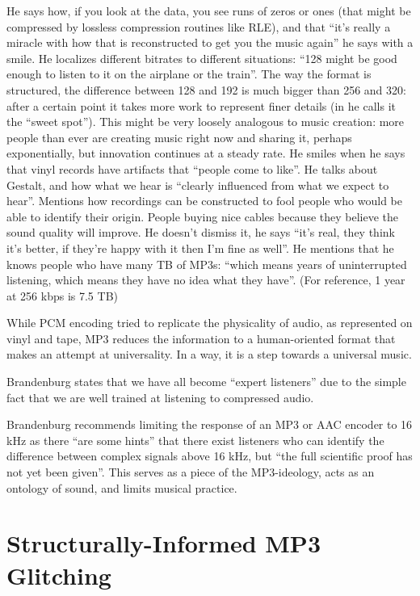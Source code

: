 \documentclass{thesis}
\begin{document}
He says how, if you look at the data, you see runs of zeros or ones (that might be compressed by lossless compression routines like RLE), and that ``it's really a miracle with how that is reconstructed to get you the music again'' he says with a smile. He localizes different bitrates to different situations: ``128 might be good enough to listen to it on the airplane or the train''. The way the format is structured, the difference between 128 and 192 is much bigger than 256 and 320: after a certain point it takes more work to represent finer details (in \cite[9]{karlheinz_brandenburg_mp3_1999} he calls it the ``sweet spot''). This might be very loosely analogous to music creation: more people than ever are creating music right now and sharing it, perhaps exponentially, but innovation continues at a steady rate. He smiles when he says that vinyl records have artifacts that ``people come to like''. He talks about Gestalt, and how what we hear is ``clearly influenced from what we expect to hear''. Mentions how recordings can be constructed to fool people who would be able to identify their origin. People buying nice cables because they believe the sound quality will improve. He doesn't dismiss it, he says ``it's real, they think it's better, if they're happy with it then I'm fine as well''. He mentions that he knows people who have many TB of MP3s: ``which means years of uninterrupted listening, which means they have no idea what they have''. (For reference, 1 year at 256 kbps is 7.5 TB) \cite{tom_merritt_real_2010}

While PCM encoding tried to replicate the physicality of audio, as represented on vinyl and tape, MP3 reduces the information to a human-oriented format that makes an attempt at universality. In a way, it is a step towards a universal music.

Brandenburg states that we have all become ``expert listeners'' due to the simple fact that we are well trained at listening to compressed audio.\cite[9]{karlheinz_brandenburg_mp3_1999}

Brandenburg recommends limiting the response of an MP3 or AAC encoder to 16 kHz as there ``are some hints'' that there exist listeners who can identify the difference between complex signals above 16 kHz, but ``the full scientific proof has not yet been given''.\cite[10]{karlheinz_brandenburg_mp3_1999} This serves as a piece of the MP3-ideology, acts as an ontology of sound, and limits musical practice.
	
\section{Structurally-Informed MP3 Glitching}
\end{document}
